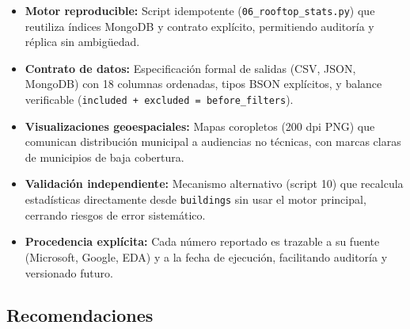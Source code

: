 \documentclass[11pt, a4paper]{article}
\begin{document}
\begin{itemize}
    \item \textbf{Motor reproducible:} Script idempotente (\texttt{06\_rooftop\_stats.py}) que reutiliza índices MongoDB y contrato explícito, permitiendo auditoría y réplica sin ambigüedad.

    \item \textbf{Contrato de datos:} Especificación formal de salidas (CSV, JSON, MongoDB) con 18 columnas ordenadas, tipos BSON explícitos, y balance verificable (\texttt{included + excluded = before\_filters}).

    \item \textbf{Visualizaciones geoespaciales:} Mapas coropletos (200 dpi PNG) que comunican distribución municipal a audiencias no técnicas, con marcas claras de municipios de baja cobertura.

    \item \textbf{Validación independiente:} Mecanismo alternativo (script 10) que recalcula estadísticas directamente desde \texttt{buildings} sin usar el motor principal, cerrando riesgos de error sistemático.

    \item \textbf{Procedencia explícita:} Cada número reportado es trazable a su fuente (Microsoft, Google, EDA) y a la fecha de ejecución, facilitando auditoría y versionado futuro.
\end{itemize}

\subsection{Recomendaciones}
\end{document}
